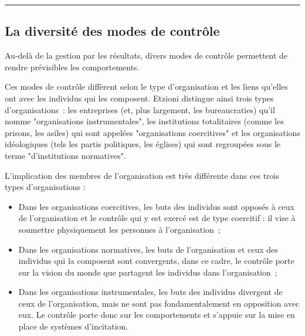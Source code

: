 \documentclass[oneside]{kaobook}
\begin{document}
\noindent\rule{\textwidth}{0.5pt}

\subsection{La diversité des modes de contrôle}
\label{sec:orgc93c1b5}
Au-delà de la gestion par les résultats, divers modes de contrôle permettent de rendre prévisibles les comportements. 

Ces modes de contrôle diffèrent selon le type d'organisation et les liens qu'elles ont avec les individus qui les composent. Etzioni distingue ainsi trois types d'organisations : les entreprises (et, plus largement, les bureaucraties) qu'il nomme "organisations instrumentales", les institutions totalitaires (comme les prisons, les asiles) qui sont appelées "organisations coercitives" et les organisations idéologiques (tels les partis politiques, les églises) qui sont regroupées sous le terme "d'institutions normatives".

L'implication des membres de l'organisation est très différente dans ces trois types d'organisations :
\begin{itemize}
\item Dans les organisations coercitives, les buts des individus sont opposés à ceux de l'organisation et le contrôle qui y est exercé est de type coercitif : il vise à soumettre physiquement les personnes à l'organisation ;
\item Dans les organisations normatives, les buts de l'organisation et ceux des individus qui la composent sont convergents, dans ce cadre, le contrôle porte sur la vision du monde que partagent les individus dans l'organisation ;
\item Dans les organisations instrumentales, les buts des individus divergent de ceux de l'organisation, mais ne sont pas fondamentalement en opposition avec eux. Le contrôle porte donc sur les comportements et s'appuie sur la mise en place de systèmes d'incitation.
\end{itemize}
\end{document}
